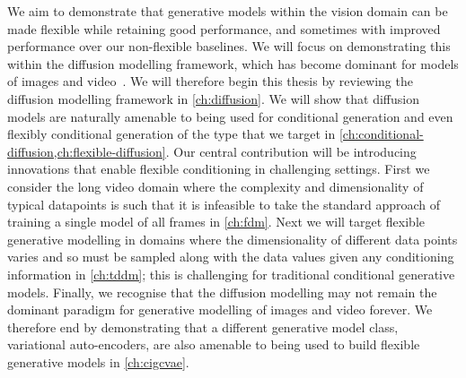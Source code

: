 
We aim to demonstrate that generative models within the vision domain can be made flexible while retaining good performance, and sometimes with improved performance over our non-flexible baselines. We will focus on demonstrating this within the diffusion modelling framework, which has become dominant for models of images and video~\citep{sohl2015deep,ho2020denoising,dhariwal2021diffusion,rombach2022high,ho2022imagen,peebles2022scalable,brooks2024video}. We will therefore begin this thesis by reviewing the diffusion modelling framework in \cref{ch:diffusion}. We will show that diffusion models are naturally amenable to being used for conditional generation and even flexibly conditional generation of the type that we target in \cref{ch:conditional-diffusion,ch:flexible-diffusion}. Our central contribution will be introducing innovations that enable flexible conditioning in challenging settings. First we consider the long video domain where the complexity and dimensionality of typical datapoints is such that it is infeasible to take the standard approach of training a single model of all frames in \cref{ch:fdm}. Next we will target flexible generative modelling in domains where the dimensionality of different data points varies and so must be sampled along with the data values given any conditioning information in \cref{ch:tddm}; this is challenging for traditional conditional generative models. Finally, we recognise that the diffusion modelling may not remain the dominant paradigm for generative modelling of images and video forever. We therefore end by demonstrating that a different generative model class, variational auto-encoders, are also amenable to being used to build flexible generative models in \cref{ch:cigcvae}.

